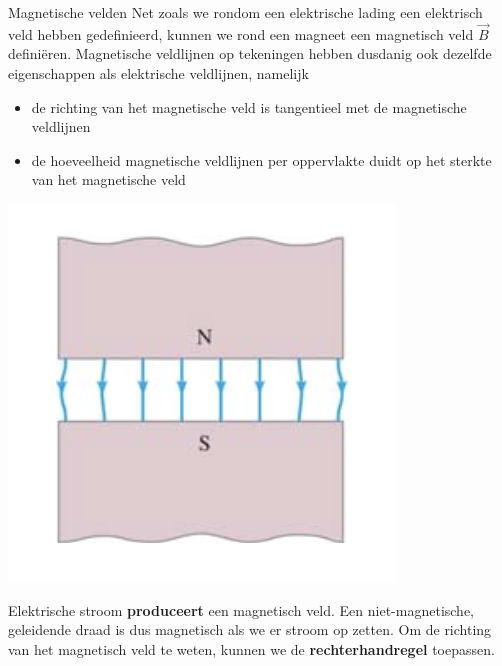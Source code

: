 \begin{theo}{Magnetische velden}
    Net zoals we rondom een elektrische lading een elektrisch veld hebben gedefinieerd, kunnen we rond een magneet een magnetisch veld
    $\Vec{B}$ definiëren. Magnetische veldlijnen op tekeningen hebben dusdanig ook dezelfde eigenschappen als elektrische veldlijnen, namelijk

    \begin{minipage}{.7\textwidth}
        \begin{itemize}
            \item de richting van het magnetische veld is tangentieel met de magnetische veldlijnen
            \item de hoeveelheid magnetische veldlijnen per oppervlakte duidt op het sterkte van het magnetische veld
        \end{itemize}

    \end{minipage}
    \begin{minipage}{.24\textwidth}
        \includegraphics[scale = 0.52]{Images/Magnetisme/HomogeenMagnetischVeld}
    \end{minipage}

    \noindent Elektrische stroom \textbf{produceert} een magnetisch veld. Een niet-magnetische, geleidende draad is dus magnetisch als we er stroom op zetten.
    Om de richting van het magnetisch veld te weten, kunnen we de \textbf{rechterhandregel} toepassen.


\end{theo}

